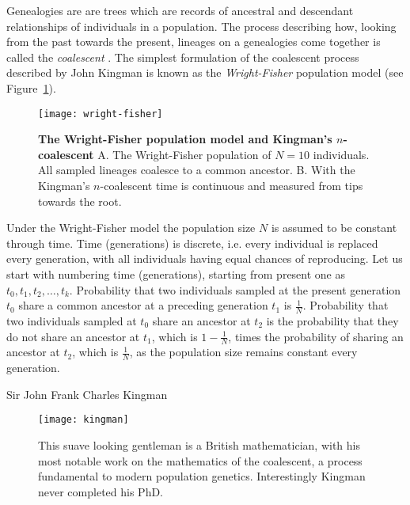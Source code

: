 Genealogies are are trees which are records of ancestral and descendant relationships of individuals in a population.
The process describing how, looking from the past towards the present, lineages on a genealogies come together is called the \textit{coalescent} \citep{Kingman1982}.
The simplest formulation of the coalescent process described by John Kingman is known as the \textit{Wright-Fisher} \citep{Fisher1930,Wright1931} population model (see Figure~\ref{fig:wright-fisher}).

\begin{figure}[H]
\centering
\texttt{[image: wright-fisher]} 
\caption{
{ \footnotesize 
{\bf The Wright-Fisher population model and Kingman's $n$-coalescent} A. The Wright-Fisher population of $N=10$ individuals. All sampled lineages coalesce to a common ancestor.
B. With the Kingman's $n$-coalescent time is continuous and measured from tips towards the root.
}%
}
\label{fig:wright-fisher}
\end{figure}

Under the Wright-Fisher model the population size $N$ is assumed to be constant through time.
Time (generations) is discrete, i.e. every individual is replaced every generation, with all individuals having equal chances of reproducing.
Let us start with numbering time (generations), starting from present one as $t_{0},t_{1},t_{2},\ldots,t_{k}$.
Probability that two individuals sampled at the present generation $t_{0}$ share a common ancestor at a preceding generation $t_{1}$ is $\frac{1}{N}$.
Probability that two individuals sampled at $t_{0}$ share an ancestor at $t_{2}$ is the probability that they do not share an ancestor at $t_{1}$, which is $1-\frac{1}{N}$, times the probability of sharing an ancestor at $t_{2}$, which is $\frac{1}{N}$, as the population size remains constant every generation.

\begin{remark}{Sir John Frank Charles Kingman}
\begin{figure}[H]
\centering
\texttt{[image: kingman]} 
\caption{
{ \footnotesize 
This suave looking gentleman is a British mathematician, with his most notable work on the mathematics of the coalescent, a process fundamental to modern population genetics. 
Interestingly Kingman never completed his PhD.
}%
}
\label{fig:kingman}
\end{figure}
\end{remark}

